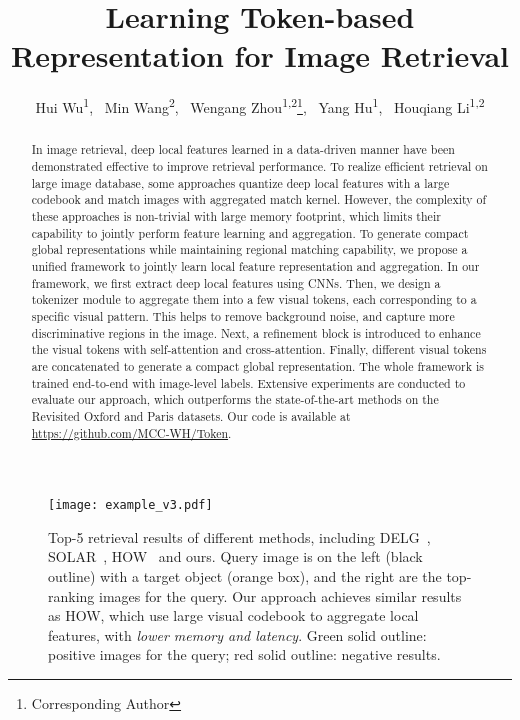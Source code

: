 \documentclass[letterpaper]{article} \usepackage{aaai22}  \usepackage{times}  \usepackage{helvet}  \usepackage{courier}  \usepackage[hyphens]{url}  \usepackage{graphicx} \urlstyle{rm} \def\UrlFont{\rm}  \usepackage{natbib}  \usepackage{caption} \DeclareCaptionStyle{ruled}{labelfont=normalfont,labelsep=colon,strut=off} \frenchspacing  \setlength{\pdfpagewidth}{8.5in}  \setlength{\pdfpageheight}{11in}  \usepackage{algorithm}
\title{Learning Token-based Representation for Image Retrieval}
\author {
Hui Wu\textsuperscript{\rm 1},~
	{Min Wang\textsuperscript{\rm 2}\footnotemark[1],~
	Wengang Zhou\textsuperscript{\rm 1,2}}\thanks{Corresponding Author},~
	Yang Hu\textsuperscript{\rm 1},~
	Houqiang Li\textsuperscript{\rm 1,2} \\
}
\begin{document}
\maketitle
\begin{abstract}
	In image retrieval, deep local features learned in a data-driven manner have been demonstrated effective to improve retrieval performance. 
	To realize efficient retrieval on large image database, some approaches quantize deep local features with a large codebook and match images with aggregated match kernel.
	However, the complexity of these approaches is non-trivial with large memory footprint, which limits their capability to jointly perform feature learning and aggregation.
	To generate compact global representations while maintaining regional
	 matching capability, we propose a unified framework to jointly learn local feature representation and aggregation.
	In our framework, we first extract deep local features using CNNs. 
	Then, we design a tokenizer module to aggregate them into a few visual tokens, each corresponding to a specific visual pattern.
	This helps to remove background noise, and capture more discriminative regions in the image. 
	Next, a refinement block is introduced to enhance the visual tokens with self-attention and cross-attention. Finally, different visual tokens are concatenated to generate a compact global representation. 
	The whole framework is trained end-to-end with image-level labels. 
	Extensive experiments are conducted to evaluate our approach, which outperforms the state-of-the-art methods on the Revisited Oxford and Paris datasets. Our code is available at \url{https://github.com/MCC-WH/Token}.
\end{abstract}

\begin{figure}[t]
	\begin{center}
		\texttt{[image: example\_v3.pdf]}
	\end{center}
	\caption{Top-5 retrieval results of different methods, including DELG~\cite{cao2020unifying}, SOLAR~\cite{ng2020solar}, HOW~\cite{tolias2020learning} and ours. Query image is on the left (black outline) with a target object (orange box), and the right are the top-ranking images for the query. Our approach achieves similar results as HOW, which use large visual codebook to aggregate local features, with \textit{lower memory and latency}. Green solid outline: positive images for the query; red solid outline: negative results.}
	\label{fig:example}
\end{figure}
\end{document}
